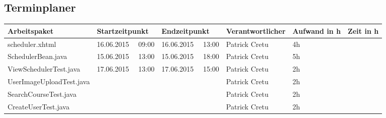 \begin{landscape}
	\subsection{Terminplaner}
	\begin{tabular}{|p{10.3cm}|p{3.2cm}|p{3.2cm}|p{3.5cm}|p{1.7cm}|p{1.5cm}|}
		\hline  \textbf{Arbeitspaket} & \textbf{Startzeitpunkt} & \textbf{Endzeitpunkt} & \textbf{Verantwortlicher}  & \textbf{Aufwand in h} & \textbf{Zeit in h}\\
		\hline   scheduler.xhtml                                 & 16.06.2015 \ \ 09:00        & 16.06.2015 \ \ 13:00       & Patrick Cretu  &  4h  &    \\ 
		\hline   SchedulerBean.java                              & 15.06.2015 \ \ 13:00        & 15.06.2015 \ \ 18:00       & Patrick Cretu  &  5h  &    \\ 
		\hline   ViewSchedulerTest.java                          & 17.06.2015 \ \ 13:00 & 17.06.2015 \ \ 15:00              & Patrick Cretu  &  2h  &    \\
		\hline   UserImageUploadTest.java                        &                      &                                   & Patrick Cretu  &  2h  &    \\
		\hline   SearchCourseTest.java                           &                      &                                   & Patrick Cretu  &  2h  &    \\
		\hline   CreateUserTest.java                             &                      &                                   & Patrick Cretu  &  2h  &    \\
		\hline 
	\end{tabular} \ \\
	\ \\
	

\end{landscape}
